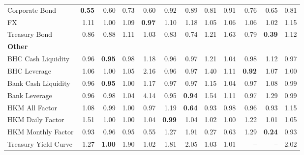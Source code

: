 \begin{table}[htbp]
\begin{tabular}{@{}lrrrrrrrrrrr@{}}
Corporate Bond & \textbf{0.55} & 0.60 & 0.73 & 0.60 & 0.92 & 0.89 & 0.81 & 0.91 & 0.76 & 0.65 & 0.81 \\
FX & 1.11 & 1.00 & 1.09 & \textbf{0.97} & 1.10 & 1.18 & 1.05 & 1.06 & 1.06 & 1.02 & 1.15 \\
Treasury Bond & 0.86 & 0.88 & 1.11 & 1.03 & 0.83 & 0.74 & 1.21 & 1.63 & 0.79 & \textbf{0.39} & 1.12 \\
\midrule
\multicolumn{12}{l}{\textbf{Other}} \\
BHC Cash Liquidity & 0.96 & \textbf{0.95} & 0.98 & 1.18 & 0.96 & 0.97 & 1.21 & 1.04 & 0.98 & 1.12 & 0.97 \\
BHC Leverage & 1.06 & 1.00 & 1.05 & 2.16 & 0.96 & 0.97 & 1.40 & 1.11 & \textbf{0.92} & 1.07 & 1.00 \\
Bank Cash Liquidity & 0.96 & \textbf{0.95} & 1.00 & 1.17 & 0.97 & 0.97 & 1.15 & 1.04 & 0.97 & 1.08 & 0.99 \\
Bank Leverage & 0.96 & 0.98 & 1.04 & 4.14 & 0.95 & \textbf{0.94} & 1.54 & 1.11 & 0.97 & 1.29 & 0.99 \\
HKM All Factor & 1.08 & 0.99 & 1.00 & 0.97 & 1.19 & \textbf{0.64} & 0.93 & 0.98 & 0.96 & 0.93 & 1.15 \\
HKM Daily Factor & 1.51 & 1.00 & 1.00 & 1.04 & \textbf{0.99} & 1.04 & 1.02 & 1.00 & 1.22 & 1.01 & 1.05 \\
HKM Monthly Factor & 0.93 & 0.96 & 0.95 & 0.55 & 1.27 & 1.91 & 0.27 & 0.63 & 1.29 & \textbf{0.24} & 0.93 \\
Treasury Yield Curve & 1.27 & \textbf{1.00} & 1.90 & 1.02 & 1.81 & 2.05 & 1.03 & 1.01 & -- & -- & 2.02 \\
\bottomrule
\end{tabular}
\vspace{0.1cm}

\end{table}
